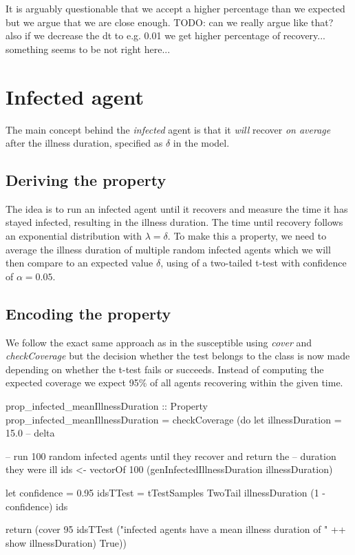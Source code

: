 It is arguably questionable that we accept a higher percentage than we expected but we argue that we are close enough. TODO: can we really argue like that? also if we decrease the dt to e.g. 0.01 we get higher percentage of recovery... something seems to be not right here...

\section{Infected agent}
The main concept behind the \textit{infected} agent is that it \textit{will} recover \textit{on average} after the illness duration, specified as $\delta$ in the model.

\subsection{Deriving the property}
The idea is to run an infected agent until it recovers and measure the time it has stayed infected, resulting in the illness duration. The time until recovery follows an exponential distribution with $\lambda = \delta$. To make this a property, we need to average the illness duration of multiple random infected agents which we will then compare to an expected value $\delta$, using of a two-tailed t-test with confidence of $\alpha = 0.05$.
 
\subsection{Encoding the property}
We follow the exact same approach as in the susceptible using \textit{cover} and \textit{checkCoverage} but the decision whether the test belongs to the class is now made depending on whether the t-test fails or succeeds. Instead of computing the expected coverage we expect 95\% of all agents recovering within the given time.

\begin{HaskellCode}
prop_infected_meanIllnessDuration :: Property
prop_infected_meanIllnessDuration = checkCoverage (do
  let illnessDuration = 15.0 -- delta
  
  -- run 100 random infected agents until they recover and return the 
  -- duration they were ill
  ids <- vectorOf 100 (genInfectedIllnessDuration illnessDuration)
    
  let confidence = 0.95
      idsTTest   = tTestSamples TwoTail illnessDuration (1 - confidence) ids

  return (cover 95 idsTTest
         ("infected agents have a mean illness duration of " ++ show illnessDuration) True))
\end{HaskellCode}

